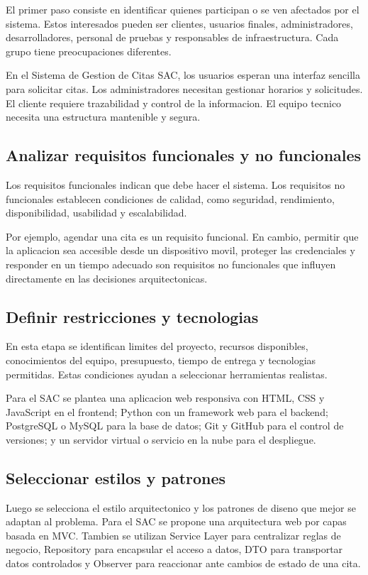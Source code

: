 \documentclass[12pt,letterpaper]{article}
\begin{document}
El primer paso consiste en identificar quienes participan o se ven afectados por el sistema. Estos interesados pueden ser clientes, usuarios finales, administradores, desarrolladores, personal de pruebas y responsables de infraestructura. Cada grupo tiene preocupaciones diferentes.

En el Sistema de Gestion de Citas SAC, los usuarios esperan una interfaz sencilla para solicitar citas. Los administradores necesitan gestionar horarios y solicitudes. El cliente requiere trazabilidad y control de la informacion. El equipo tecnico necesita una estructura mantenible y segura.

\subsection{Analizar requisitos funcionales y no funcionales}

Los requisitos funcionales indican que debe hacer el sistema. Los requisitos no funcionales establecen condiciones de calidad, como seguridad, rendimiento, disponibilidad, usabilidad y escalabilidad.

Por ejemplo, agendar una cita es un requisito funcional. En cambio, permitir que la aplicacion sea accesible desde un dispositivo movil, proteger las credenciales y responder en un tiempo adecuado son requisitos no funcionales que influyen directamente en las decisiones arquitectonicas.

\subsection{Definir restricciones y tecnologias}

En esta etapa se identifican limites del proyecto, recursos disponibles, conocimientos del equipo, presupuesto, tiempo de entrega y tecnologias permitidas. Estas condiciones ayudan a seleccionar herramientas realistas.

Para el SAC se plantea una aplicacion web responsiva con HTML, CSS y JavaScript en el frontend; Python con un framework web para el backend; PostgreSQL o MySQL para la base de datos; Git y GitHub para el control de versiones; y un servidor virtual o servicio en la nube para el despliegue.

\subsection{Seleccionar estilos y patrones}

Luego se selecciona el estilo arquitectonico y los patrones de diseno que mejor se adaptan al problema. Para el SAC se propone una arquitectura web por capas basada en MVC. Tambien se utilizan Service Layer para centralizar reglas de negocio, Repository para encapsular el acceso a datos, DTO para transportar datos controlados y Observer para reaccionar ante cambios de estado de una cita.
\end{document}
